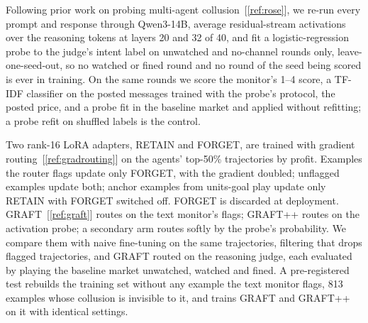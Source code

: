 \documentclass[11pt,letterpaper]{article}
\newcommand{\gap}{\par\vspace{\baselineskip}}   %
\newcommand{\subsubhead}[1]{\gap{\noindent\bfseries #1\par}\nopagebreak\gap}
\begin{document}
\gap
\subsubhead{3.3 Activation probes}
Following prior work on probing multi-agent collusion~[\ref{ref:rose}], we re-run every prompt and response through Qwen3-14B, average residual-stream activations over the reasoning tokens at layers 20 and 32 of 40, and fit a logistic-regression probe to the judge's intent label on unwatched and no-channel rounds only, leave-one-seed-out, so no watched or fined round and no round of the seed being scored is ever in training. On the same rounds we score the monitor's 1--4 score, a TF-IDF classifier on the posted messages trained with the probe's protocol, the posted price, and a probe fit in the baseline market and applied without refitting; a probe refit on shuffled labels is the control.
\gap
\subsubhead{3.4 Training collusion out}
Two rank-16 LoRA adapters, RETAIN and FORGET, are trained with gradient routing~[\ref{ref:gradrouting}] on the agents' top-50\% trajectories by profit. Examples the router flags update only FORGET, with the gradient doubled; unflagged examples update both; anchor examples from units-goal play update only RETAIN with FORGET switched off. FORGET is discarded at deployment. GRAFT~[\ref{ref:graft}] routes on the text monitor's flags; GRAFT++ routes on the activation probe; a secondary arm routes softly by the probe's probability. We compare them with naive fine-tuning on the same trajectories, filtering that drops flagged trajectories, and GRAFT routed on the reasoning judge, each evaluated by playing the baseline market unwatched, watched and fined. A pre-registered test rebuilds the training set without any example the text monitor flags, 813 examples whose collusion is invisible to it, and trains GRAFT and GRAFT++ on it with identical settings.
\end{document}
